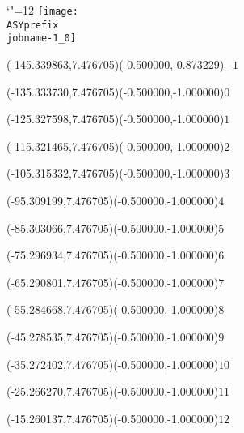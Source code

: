 \setlength{\unitlength}{1pt}%
\makeatletter%
\let\ASYencoding\f@encoding%
\let\ASYfamily\f@family%
\let\ASYseries\f@series%
\let\ASYshape\f@shape%
\makeatother%
{\catcode`"=12%
\texttt{[image: \\ASYprefix\\jobname-1\_0]}%
}%
%
\fontsize{6.022500}{7.227000}\selectfont%
\usefont{\ASYencoding}{\ASYfamily}{\ASYseries}{\ASYshape}%
\ASYalign(-145.339863,7.476705)(-0.500000,-0.873229){\vphantom{$10^4$}$-1$}%
%
\fontsize{6.022500}{7.227000}\selectfont%
\ASYalign(-135.333730,7.476705)(-0.500000,-1.000000){\vphantom{$10^4$}$0$}%
%
\fontsize{6.022500}{7.227000}\selectfont%
\ASYalign(-125.327598,7.476705)(-0.500000,-1.000000){\vphantom{$10^4$}$1$}%
%
\fontsize{6.022500}{7.227000}\selectfont%
\ASYalign(-115.321465,7.476705)(-0.500000,-1.000000){\vphantom{$10^4$}$2$}%
%
\fontsize{6.022500}{7.227000}\selectfont%
\ASYalign(-105.315332,7.476705)(-0.500000,-1.000000){\vphantom{$10^4$}$3$}%
%
\fontsize{6.022500}{7.227000}\selectfont%
\ASYalign(-95.309199,7.476705)(-0.500000,-1.000000){\vphantom{$10^4$}$4$}%
%
\fontsize{6.022500}{7.227000}\selectfont%
\ASYalign(-85.303066,7.476705)(-0.500000,-1.000000){\vphantom{$10^4$}$5$}%
%
\fontsize{6.022500}{7.227000}\selectfont%
\ASYalign(-75.296934,7.476705)(-0.500000,-1.000000){\vphantom{$10^4$}$6$}%
%
\fontsize{6.022500}{7.227000}\selectfont%
\ASYalign(-65.290801,7.476705)(-0.500000,-1.000000){\vphantom{$10^4$}$7$}%
%
\fontsize{6.022500}{7.227000}\selectfont%
\ASYalign(-55.284668,7.476705)(-0.500000,-1.000000){\vphantom{$10^4$}$8$}%
%
\fontsize{6.022500}{7.227000}\selectfont%
\ASYalign(-45.278535,7.476705)(-0.500000,-1.000000){\vphantom{$10^4$}$9$}%
%
\fontsize{6.022500}{7.227000}\selectfont%
\ASYalign(-35.272402,7.476705)(-0.500000,-1.000000){\vphantom{$10^4$}$10$}%
%
\fontsize{6.022500}{7.227000}\selectfont%
\ASYalign(-25.266270,7.476705)(-0.500000,-1.000000){\vphantom{$10^4$}$11$}%
%
\fontsize{6.022500}{7.227000}\selectfont%
\ASYalign(-15.260137,7.476705)(-0.500000,-1.000000){\vphantom{$10^4$}$12$}%
